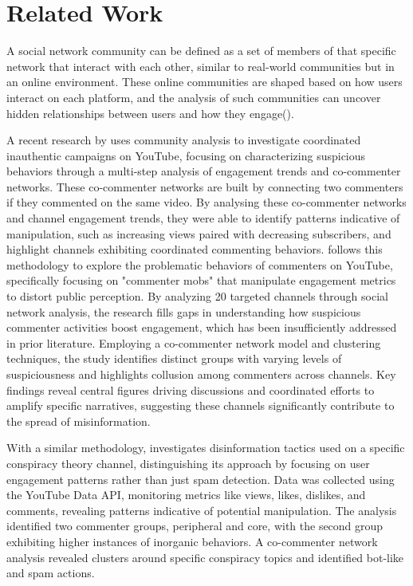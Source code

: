 \documentclass[12pt]{article}
\begin{document}
\section{Related Work}

A social network community can be defined as a set of members of that specific network that interact
with each other, similar to real-world communities but in an online environment.
These online communities are shaped based on how users interact on each platform, and the analysis
of such communities can uncover hidden relationships between users and how they engage(\cite{nooribakhsh2024community}).

A recent research by \cite{kirdemir2023} uses community analysis to investigate coordinated 
inauthentic campaigns on YouTube, focusing on characterizing suspicious behaviors through a 
multi-step analysis of engagement trends and co-commenter networks. These co-commenter networks are
built by connecting two commenters if they commented on the same video.
By analysing these co-commenter networks and channel engagement trends, they were able to identify
patterns indicative of manipulation, such as increasing views paired with decreasing subscribers, 
and highlight channels exhibiting coordinated 
commenting behaviors. \cite{shajari2023} follows this methodology to
explore the problematic behaviors of commenters on YouTube, specifically focusing on "commenter mobs" 
that manipulate engagement metrics to distort public perception. 
By analyzing 20 targeted channels through social network analysis, the research fills gaps in 
understanding how suspicious commenter activities boost engagement, which has been insufficiently 
addressed in prior literature. Employing a co-commenter network model and clustering techniques, 
the study identifies distinct groups with varying levels of suspiciousness and highlights collusion 
among commenters across channels. Key findings reveal central figures driving discussions and 
coordinated efforts to amplify specific narratives, suggesting these channels significantly contribute 
to the spread of misinformation. 

With a similar methodology, \cite{hussain2018analyzing} investigates 
disinformation tactics used on a specific conspiracy theory channel, distinguishing its approach by 
focusing on user engagement patterns rather than just spam detection. Data was collected using the 
YouTube Data API, monitoring metrics like views, likes, dislikes, and comments, revealing patterns 
indicative of potential manipulation. The analysis identified two commenter groups, peripheral and 
core, with the second group exhibiting higher instances of inorganic behaviors. A co-commenter network 
analysis revealed clusters around specific conspiracy topics and identified bot-like and spam actions. 
\end{document}
